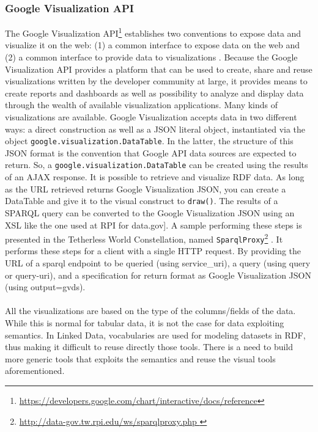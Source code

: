 \subsubsection{Google Visualization API}

The Google Visualization API\footnote{\url{https://developers.google.com/chart/interactive/docs/reference}} establishes two conventions to expose data and visualize it on the web: (1) a common interface to expose data on the web and (2) a common interface to provide data to visualizations \cite{rpi2012}.
Because the Google Visualization API provides a platform that can be used to create, share and reuse visualizations written by the developer community at large, it provides means to create reports and dashboards as well as possibility to analyze and display data through the wealth of available visualization applications. Many kinds of visualizations are available. Google Visualization accepts data in two different ways: a direct construction as well as  a JSON literal object, instantiated via the object \texttt{google.visualization.DataTable}. In the latter, the structure of this JSON format is the convention that Google API data sources are expected to return. So, a \texttt{google.visualization.DataTable} can be created using the results of an AJAX response.
It is possible to retrieve and visualize RDF data. As long as the URL retrieved returns Google Visualization JSON, you can create a DataTable and give it to the visual construct to \texttt{draw()}.  The results of a SPARQL query can be converted to the Google Visualization JSON using an XSL like the one used at RPI for data.gov]. A sample performing these steps is presented in the Tetherless World Constellation, named \texttt{SparqlProxy}\footnote{\url{http://data-gov.tw.rpi.edu/ws/sparqlproxy.php }} . It performs these steps for a client with a single HTTP request. By providing the URL of a sparql endpoint to be queried (using service\_uri), a query (using query or query-uri), and a specification for return format as Google Visualization JSON (using output=gvds). 



\paragraph{}
All the visualizations are based on the type of the columns/fields of the data. While this is normal for tabular data, it is not the case for data exploiting semantics. In Linked Data, vocabularies are used for modeling datasets in RDF, thus making it difficult to reuse directly those tools. There is a need to build more generic tools that exploits the semantics and reuse the visual tools aforementioned. 


